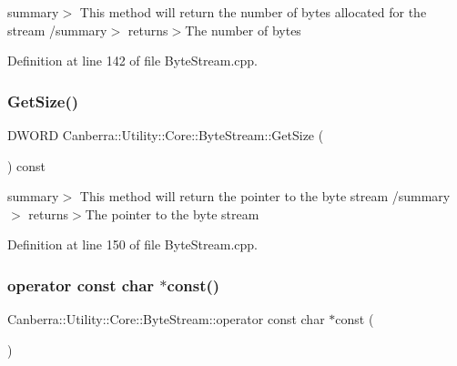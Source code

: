summary$>$ This method will return the number of bytes allocated for the stream /summary$>$ returns$>$The number of bytes

Definition at line 142 of file Byte\+Stream.\+cpp.

\mbox{\label{class_canberra_1_1_utility_1_1_core_1_1_byte_stream_a268d73a8a3a65864800e08c7a081a58d_a268d73a8a3a65864800e08c7a081a58d}} 
\subsubsection{\texorpdfstring{Get\+Size()}{GetSize()}}
{\footnotesize\ttfamily D\+W\+O\+RD Canberra\+::\+Utility\+::\+Core\+::\+Byte\+Stream\+::\+Get\+Size (\begin{DoxyParamCaption}{ }\end{DoxyParamCaption}) const}

summary$>$ This method will return the pointer to the byte stream /summary$>$ returns$>$The pointer to the byte stream

Definition at line 150 of file Byte\+Stream.\+cpp.

\mbox{\label{class_canberra_1_1_utility_1_1_core_1_1_byte_stream_a5008a7438dc03640ce29323460d7d3b0_a5008a7438dc03640ce29323460d7d3b0}} 
\subsubsection{\texorpdfstring{operator const char $\ast$const()}{operator const char *const()}}
{\footnotesize\ttfamily Canberra\+::\+Utility\+::\+Core\+::\+Byte\+Stream\+::operator const char $\ast$const (\begin{DoxyParamCaption}{ }\end{DoxyParamCaption})}

